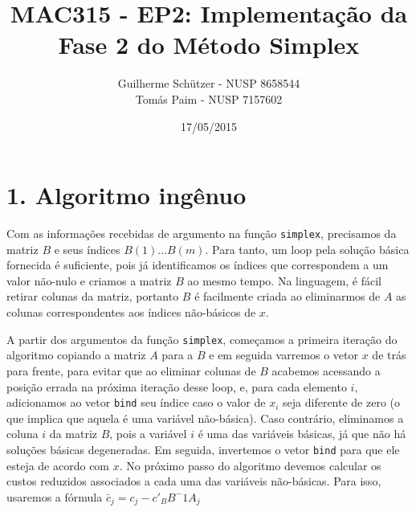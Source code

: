 \documentclass[a4paper]{article}
\title{MAC315 - EP2: Implementação da Fase 2 do Método Simplex}
\author{
	Guilherme Schützer - NUSP 8658544 \\
	Tomás Paim         - NUSP 7157602
}
\date{17/05/2015}
\begin{document}
\maketitle

\section{1. Algoritmo ingênuo}
Com as informações recebidas de argumento na função \texttt{simplex}, precisamos da matriz $B$ e seus índices $B(1)...B(m)$. Para tanto, um loop pela solução básica fornecida é suficiente, pois já identificamos os índices que correspondem a um valor não-nulo e criamos a matriz $B$ ao mesmo tempo. Na linguagem, é fácil retirar colunas da matriz, portanto $B$ é facilmente criada ao eliminarmos de $A$ as colunas correspondentes aos índices não-básicos de $x$.

A partir dos argumentos da função \texttt{simplex}, começamos a primeira iteração do algoritmo copiando a matriz $A$ para a $B$ e em seguida varremos o vetor $x$ de trás para frente, para evitar que ao eliminar colunas de $B$ acabemos acessando a posição errada na próxima iteração desse loop, e, para cada elemento $i$, adicionamos ao vetor \texttt{bind} seu índice caso o valor de $x_{i}$ seja diferente de zero (o que implica que aquela é uma variável não-básica). Caso contrário, eliminamos a coluna $i$ da matriz $B$, pois a variável $i$ é uma das variáveis básicas, já que não há soluções básicas degeneradas. Em seguida, invertemos o vetor \texttt{bind} para que ele esteja de acordo com $x$.
No próximo passo do algoritmo devemos calcular os custos reduzidos associados a cada uma das variáveis não-básicas. Para isso, usaremos a fórmula \begin{math}\bar{c}_{j} = c_{j} - c'_{B}B^-1A_{j}\end{math}
\end{document}
